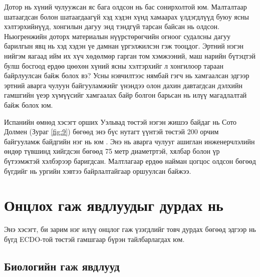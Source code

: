 \documentclass[10pt,twocolumn,letterpaper]{article}
\begin{document}
Дотор нь хүний чулуужсан яс бага олдсон нь бас сонирхолтой юм. Малталтаар шатаагдсан болон шатаагдаагүй хэд хэдэн хүнд хамаарах үлдэгдлүүд буюу ясны хэлтэрхийнүүд, хонгилын дагуу энд тэндгүй тарсан байсан нь олдсон. Ньюгренжийн доторх материалын нүүрстөрөгчийн огноог судалсны дагуу барилгын явц нь хэд хэдэн үе дамнан үргэлжилсэн гэж тооцдог. Эртний нэгэн нийгэм яагаад ийм их хүч хөдөлмөр гарган том хэмжээний, маш нарийн бүтэцтэй булш босгоод ердөө цөөхөн хүний ясны хэлтэрхийг л хонгилоор тараан байрлуулсан байж болох вэ? Усны нэвчилтээс нямбай гэгч нь хамгаалсан эдгээр эртний аварга чулуун байгууламжийг үнэндээ олон дахин давтагдсан дэлхийн гамшгийн үеэр хүмүүсийг хамгаалах байр болгон барьсан нь илүү магадлалтай байж болох юм.

Испанийн өмнөд хэсэгт орших Уэльвад төстэй нэгэн жишээ байдаг нь Сото Долмен (Зураг \ref{fig:9}) бөгөөд энэ бүс нутагт үүнтэй төстэй 200 орчим байгууламж байдгийн нэг нь юм \cite{72,32}. Энэ нь аварга чулууг ашиглан инженерчлэлийн өндөр түвшинд хийгдсэн бөгөөд 75 метр диаметртэй, хялбар болон үр бүтээмжтэй хэлбэрээр баригдсан. Малтлагаар ердөө найман цогцос олдсон бөгөөд бүгдийг нь ургийн хэвтээ байрлалтайгаар оршуулсан байжээ.

\section{Онцлох гаж явдлуудыг дурдах нь}

Энэ хэсэгт, би зарим нэг илүү онцлог гаж үзэгдлийг товч дурдах бөгөөд эдгээр нь бүгд ECDO-той төстэй гамшгаар бүрэн тайлбарлагдах юм.

\subsection{Биологийн гаж явдлууд}
\end{document}
